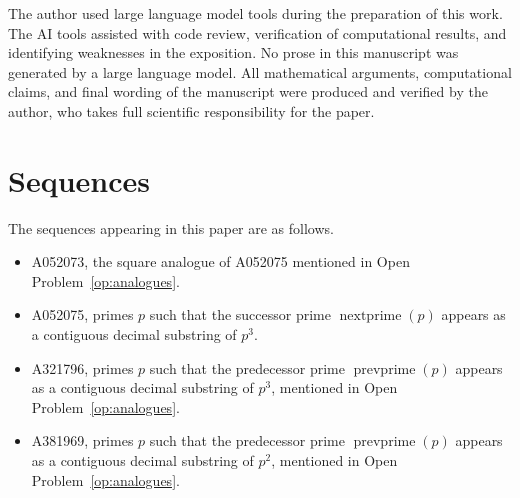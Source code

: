 \documentclass[11pt]{article}
\theoremstyle{definition}
\theoremstyle{remark}
\newcommand{\np}{\operatorname{nextprime}}
\newcommand{\prevprime}{\operatorname{prevprime}}
\begin{document}
The author used large language model tools during the preparation of
this work.
The AI tools assisted with code review, verification of computational
results, and identifying weaknesses in the exposition.
No prose in this manuscript was generated by a large language model.
All mathematical arguments, computational claims, and final wording
of the manuscript were produced and verified by the author, who takes
full scientific responsibility for the paper.

\section*{Sequences}

The sequences appearing in this paper are as follows.

\begin{itemize}
\item A052073, the square analogue of A052075
      mentioned in Open Problem~\ref{op:analogues}.
\item A052075, primes $p$ such that the successor prime
      $\np(p)$ appears as a contiguous decimal substring of $p^3$.
\item A321796, primes $p$ such that the predecessor prime
      $\prevprime(p)$ appears as a contiguous decimal substring
      of $p^3$, mentioned in Open Problem~\ref{op:analogues}.
\item A381969, primes $p$ such that the predecessor prime
      $\prevprime(p)$ appears as a contiguous decimal substring
      of $p^2$, mentioned in Open Problem~\ref{op:analogues}.
\end{itemize}
\end{document}

